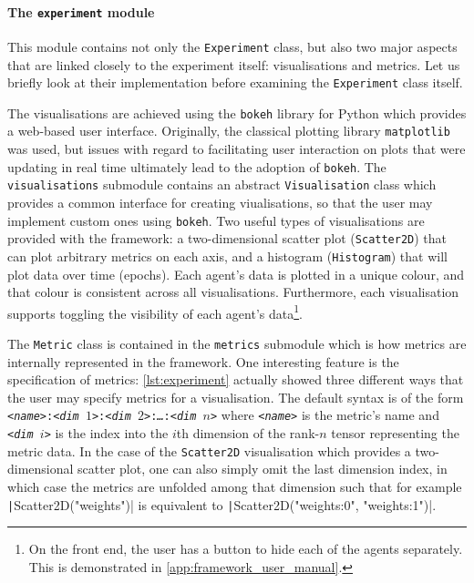 \paragraph{The \texttt{experiment} module}
This module contains not only the \texttt{Experiment} class, but also two major aspects that are linked closely to the experiment itself: visualisations and metrics.
Let us briefly look at their implementation before examining the \texttt{Experiment} class itself.

The visualisations are achieved using the \texttt{bokeh} library for Python which provides a web-based user interface.
Originally, the classical plotting library \texttt{matplotlib} was used, but issues with regard to facilitating user interaction on plots that were updating in real time ultimately lead to the adoption of \texttt{bokeh}.
The \texttt{visualisations} submodule contains an abstract \texttt{Visualisation} class which provides a common interface for creating viualisations, so that the user may implement custom ones using \texttt{bokeh}.
Two useful types of visualisations are provided with the framework: a two-dimensional scatter plot (\texttt{Scatter2D}) that can plot arbitrary metrics on each axis, and a histogram (\texttt{Histogram}) that will plot data over time (epochs).
Each agent's data is plotted in a unique colour, and that colour is consistent across all visualisations. 
Furthermore, each visualisation supports toggling the visibility of each agent's data\footnote{On the front end, the user has a button to hide each of the agents separately. This is demonstrated in \ref{app:framework_user_manual}.}.

The \texttt{Metric} class is contained in the \texttt{metrics} submodule which is how metrics are internally represented in the framework. 
One interesting feature is the specification of metrics: \ref{lst:experiment} actually showed three different ways that the user may specify metrics for a visualisation.
The default syntax is of the form
\texttt{\textit{<name>}:\textit{<dim $1$>}:\textit{<dim $2$>}:\textit{\dots}:\textit{<dim $n$>}}
where \texttt{\textit{<name>}} is the metric's name and \texttt{\textit{<dim $i$>}} is the index into the $i$th dimension of the rank-$n$ tensor representing the metric data.
In the case of the \texttt{Scatter2D} visualisation which provides a two-dimensional scatter plot, one can also simply omit the last dimension index, in which case the metrics are unfolded among that dimension such that for example
\texttt|Scatter2D("weights")| is equivalent to \texttt|Scatter2D("weights:0", "weights:1")|.

